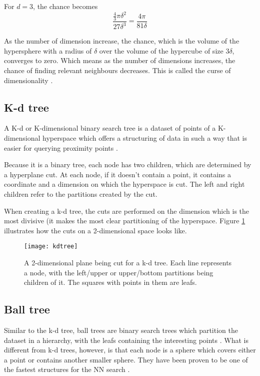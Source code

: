 For $d=3$, the chance becomes
\[ \frac{\frac{4}{3} \pi \delta^2}{27 \delta^3} = \frac{4 \pi}{81 \delta} \]

As the number of dimension increase, the chance, which is the volume of the hypersphere with a radius of $\delta$ over the volume of the hypercube of size $3\delta$, converges to zero. Which means as the number of dimensions increases, the chance of finding relevant neighbours decreases. This is called the curse of dimensionality \cite{curse}.

\subsection{K-d tree}
\label{subsec:cluster_knn_kdtree}

A K-d or K-dimensional binary search tree is a dataset of points of a K-dimensional hyperspace which offers a structuring of data in such a way that is easier for querying proximity points \cite{kdtree}. 

Because it is a binary tree, each node has two children, which are determined by a hyperplane cut. At each node, if it doesn't contain a point, it contains a coordinate and a dimension on which the hyperspace is cut. The left and right children refer to the partitions created by the cut.

When creating a k-d tree, the cuts are performed on the dimension which is the most divisive (it makes the most clear partitioning of the hyperspace. Figure \ref{fig:kdtree} illustrates how the cuts on a 2-dimensional space looks like.

\begin{figure}[b!]
\centering
\texttt{[image: kdtree]}
\caption{A 2-dimensional plane being cut for a k-d tree. Each line represents a node, with the left/upper or upper/bottom partitions being children of it. The squares with points in them are leafs.}
\label{fig:kdtree}
\end{figure}

\subsection{Ball tree}
\label{subsec:cluster_knn_balltree}

Similar to the k-d tree, ball trees are binary search trees which partition the dataset in a hierarchy, with the leafs containing the interesting points \cite{balltree}. What is different from k-d trees, however, is that each node is a sphere which covers either a point or contains another smaller sphere. They have been proven to be one of the fastest structures for the NN search \cite{balltree}.

